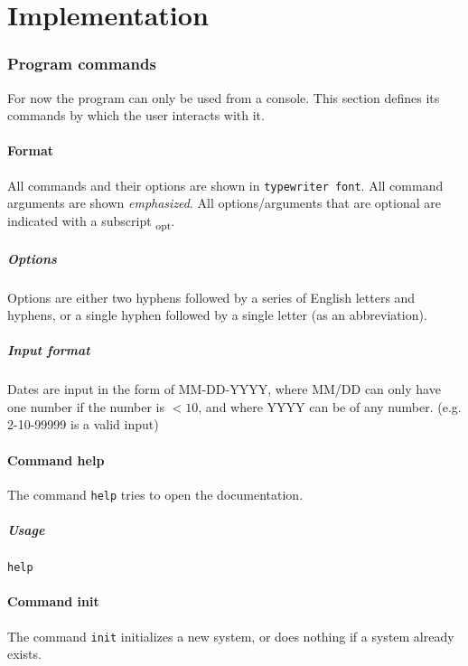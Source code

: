 \part{Implementation}

\section{Program commands}
For now the program can only be used from a console. This section defines its commands by which the user interacts with it.

\subsection{Format}
All commands and their options are shown in \texttt{typewriter font}. All command arguments are shown \emph{emphasized}. All options/arguments that are optional are indicated with a subscript \textsubscript{opt}.

\subsubsection{Options}
Options are either two hyphens followed by a series of English letters and hyphens, or a single hyphen followed by a single letter (as an abbreviation).

\subsubsection{Input format} \label{subsubsec:cmd:format:inp.format}
Dates are input in the form of MM-DD-YYYY, where MM/DD can only have one number if the number is $< 10$, and where YYYY can be of any number. (e.g. 2-10-99999 is a valid input)

\subsection{Command help}
The command \texttt{help} tries to open the documentation.

\subsubsection{Usage}
\begin{center}
	\texttt{help}
\end{center}

\subsection{Command init}
The command \texttt{init} initializes a new system, or does nothing if a system already exists.

